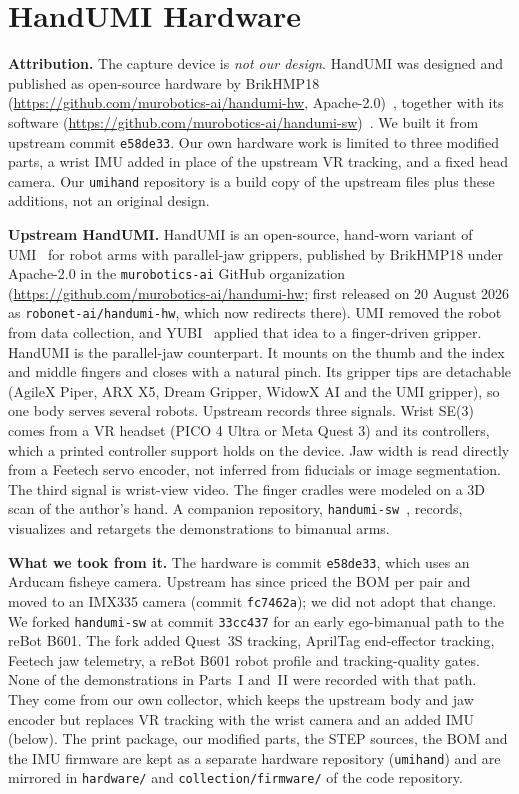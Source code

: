 \documentclass[conference,10pt]{IEEEtran}
\newcounter{rpart}
\begin{document}
\section{HandUMI Hardware}\label{p1:sec:hw}
\textbf{Attribution.} The capture device is \emph{not our design}. HandUMI was designed and published as open-source hardware
by BrikHMP18 (\url{https://github.com/murobotics-ai/handumi-hw}, Apache-2.0)~\cite{handumi_hw}, together with its software
(\url{https://github.com/murobotics-ai/handumi-sw})~\cite{handumi_sw}. We built it from upstream commit \texttt{e58de33}. Our own
hardware work is limited to three modified parts, a wrist IMU added in place of the upstream VR tracking, and a fixed head
camera. Our \texttt{umihand} repository is a build copy of the upstream files plus these additions, not an original design.

\textbf{Upstream HandUMI.} HandUMI is an open-source, hand-worn variant of UMI~\cite{chi2024umi} for robot arms with
parallel-jaw grippers, published by BrikHMP18 under Apache-2.0 in the \texttt{murobotics-ai} GitHub organization
(\url{https://github.com/murobotics-ai/handumi-hw}; first released on 20 August 2026 as \texttt{robonet-ai/handumi-hw}, which
now redirects there). UMI removed the robot from data collection, and YUBI~\cite{ohkawa2026yubi} applied that idea to a
finger-driven gripper. HandUMI is the parallel-jaw counterpart. It mounts on the thumb and the index and middle fingers and
closes with a natural pinch. Its gripper tips are detachable (AgileX Piper, ARX X5, Dream Gripper, WidowX AI and the UMI
gripper), so one body serves several robots. Upstream records three signals. Wrist SE(3) comes from a VR headset (PICO 4
Ultra or Meta Quest 3) and its controllers, which a printed controller support holds on the device. Jaw width is read
directly from a Feetech servo encoder, not inferred from fiducials or image segmentation. The third signal is wrist-view
video. The finger cradles were modeled on a 3D scan of the author's hand. A companion repository,
\texttt{handumi-sw}~\cite{handumi_sw}, records, visualizes and retargets the demonstrations to bimanual arms.

\textbf{What we took from it.} The hardware is commit \texttt{e58de33}, which uses an Arducam fisheye camera. Upstream has since
priced the BOM per pair and moved to an IMX335 camera (commit \texttt{fc7462a}); we did not adopt that change. We forked
\texttt{handumi-sw} at commit \texttt{33cc437} for an early ego-bimanual path to the reBot B601. The fork added Quest~3S
tracking, AprilTag end-effector tracking, Feetech jaw telemetry, a reBot B601 robot profile and tracking-quality gates.
None of the demonstrations in Parts~I and~II were recorded with that path. They come from our own collector, which keeps
the upstream body and jaw encoder but replaces VR tracking with the wrist camera and an added IMU (below). The print package, our modified parts, the STEP sources, the BOM and the IMU
firmware are kept as a separate hardware repository (\texttt{umihand}) and are mirrored in \texttt{hardware/} and
\texttt{collection/firmware/} of the code repository.
\end{document}
